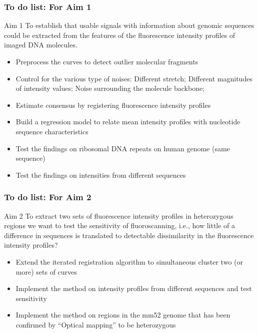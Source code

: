 \documentclass[10pt,dvipsnames,table]{beamer}
\begin{document}

\begin{frame}
\frametitle{To do list: For Aim 1}
\begin{block}{Aim 1}
To establish that usable signals with information about genomic sequences could be extracted from the features of the fluorescence intensity profiles of imaged DNA molecules.
\end{block}
\begin{itemize}
\item[\checkmark] Preprocess the curves to detect outlier molecular fragments
\item[\checkmark] Control for the various type of noises: Different stretch; Different magnitudes of intensity values; Noise surrounding the molecule backbone; 
\item[\checkmark] Estimate consensus by registering fluorescence intensity profiles
\item Build a regression model to relate mean intensity profiles with nucleotide sequence characteristics
\item Test the findings on ribosomal DNA repeats on human genome (same sequence)
\item Test the findings on intensities from different sequences
\end{itemize}
\end{frame}

\begin{frame}
\frametitle{To do list: For Aim 2}
\begin{block}{Aim 2}
To extract two sets of fluorescence intensity profiles in heterozygous regions we want to test the sensitivity of fluoroscanning, i.e., how little of a difference in sequences is translated to detectable dissimilarity in the fluorescence intensity profiles?
\end{block}
\begin{itemize}
\item Extend the iterated registration algorithm to simultaneous cluster two (or more) sets of curves
\item Implement the method on intensity profiles from different sequences and test sensitivity
\item Implement the method on regions in the mm52 genome that has been confirmed by ``Optical mapping'' to be heterozygous
\end{itemize}
\end{frame}
\end{document}
